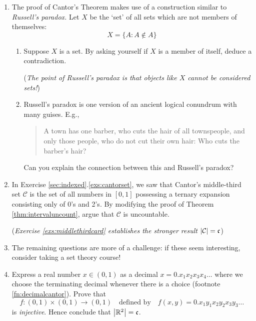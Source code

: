 \begin{exercises}{}{}
\begin{enumerate}
 	
   	\item The proof of Cantor's Theorem makes use of a construction similar to \emph{Russell's paradox.} Let $X$ be the `set' of all sets which are not members of themselves:
  	\[
  		X=\{A:A\not\in A\}
  	\]
  	\begin{enumerate}
    	\item Suppose $X$ is a set. By asking yourself if $X$ is a member of itself, deduce a contradiction.\par
    	(\emph{The point of Russell's paradox is that objects like $X$ cannot be considered sets!})
    	\item Russell's paradox is one version of an ancient logical conundrum with many guises. E.g.,
    	\begin{quote}
    		A town has one barber, who cuts the hair of all townspeople, and only those people, who do not cut their own hair: Who cuts the barber's hair?
    	\end{quote}
    	Can you explain the connection between this and Russell's paradox?
  	\end{enumerate}
  	
  
		\item In Exercise \ref*{sec:indexed}.\ref{exs:cantorset}, we saw that Cantor's middle-third set $\mathcal C$ is the set of all numbers in $[0,1]$ possessing a ternary expansion consisting only of 0's and 2's. By modifying the proof of Theorem \ref{thm:intervaluncount}, argue that $\mathcal C$ is uncountable.\par
		(\emph{Exercise \ref{exs:middlethirdcard} establishes the stronger result $\left| \mathcal C\right|=\mathfrak{c}$})
  
  
  	\goodbreak
  	
  	
  	\item[]The remaining questions are more of a challenge: if these seem interesting, consider taking a set theory course!
  	
  	
  	\item Express a real number $x\in(0,1)$ as a decimal $x=0.x_1x_2x_3x_4\ldots$	where we choose the terminating decimal whenever there is a choice (footnote \ref{fn:decimalcantor}). Prove that
  	\[
  		f:(0,1)\times (0,1)\to (0,1)
  		\quad\text{defined by}\quad
  		f(x,y)=0.x_1y_1x_2y_2x_3y_3\ldots
  	\]
  	is \emph{injective}. Hence conclude that $\left| \mathbb{R}^2\right|=\mathfrak{c}$.
		

\end{enumerate}
\end{exercises}
